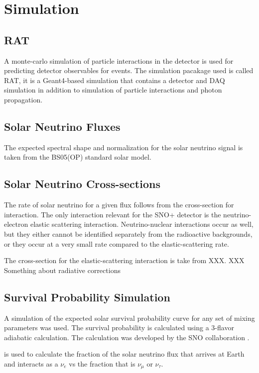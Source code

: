 \section{Simulation}
\subsection{RAT}
A monte-carlo simulation of particle interactions in the detector is used
for predicting detector observables for events.
The simulation pacakage used is called RAT, it is a Geant4-based simulation that
contains a detector and DAQ simulation in addition to simulation of particle
interactions and photon propagation.

\subsection{Solar Neutrino Fluxes}
The expected spectral shape and normalization for the solar neutrino signal is
taken from the BS05(OP) standard solar model.

\subsection{Solar Neutrino Cross-sections}
The rate of solar neutrino for a given flux follows from the cross-section for
interaction. The only interaction relevant for the SNO+ detector is the
neutrino-electron elastic scattering interaction.
Neutrino-nuclear interactions occur as well, but they either cannot be identified
separately from the radioactive backgrounds, or they occur at a very small rate
compared to the elastic-scattering rate.

The cross-section for the elastic-scattering interaction is take from
XXX.
XXX Something about radiative corrections

\subsection{Survival Probability Simulation}
A simulation of the expected solar survival probability curve for any set of mixing
parameters was used. The survival probability is calculated using a
3-flavor adiabatic calculation. The calculation was developed by the
SNO collaboration \cite{XXX}.

is used to calculate the fraction of the solar neutrino flux that arrives
at Earth and interacts as a $\nu_{e}$ vs the fraction that is $\nu_{\mu}$ or $\nu_{\tau}$.

